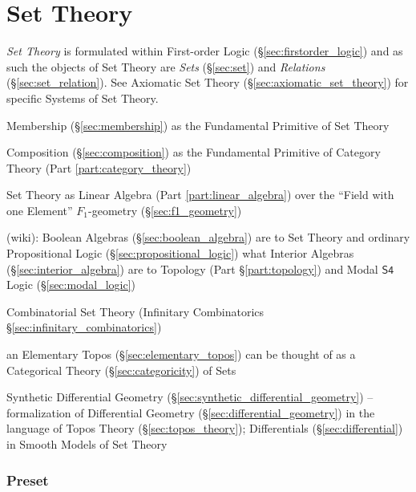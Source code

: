 \part{Set Theory}\label{part:set_theory}

\emph{Set Theory} is formulated within First-order Logic
(\S\ref{sec:firstorder_logic}) and as such the objects of Set Theory
are \emph{Sets} (\S\ref{sec:set}) and \emph{Relations}
(\S\ref{sec:set_relation}). See Axiomatic Set Theory
(\S\ref{sec:axiomatic_set_theory}) for specific Systems of Set Theory.

Membership (\S\ref{sec:membership}) as the Fundamental Primitive of Set
Theory

Composition (\S\ref{sec:composition}) as the Fundamental Primitive of
Category Theory (Part \ref{part:category_theory})

Set Theory as Linear Algebra (Part \ref{part:linear_algebra}) over the
``Field with one Element'' \fist $F_1$-geometry (\S\ref{sec:f1_geometry})

(wiki):
Boolean Algebras (\S\ref{sec:boolean_algebra}) are to Set Theory and ordinary
Propositional Logic (\S\ref{sec:propositional_logic}) what Interior Algebras
(\S\ref{sec:interior_algebra}) are to Topology (Part \S\ref{part:topology}) and
Modal $\mathsf{S4}$ Logic (\S\ref{sec:modal_logic})

Combinatorial Set Theory (Infinitary Combinatorics
\S\ref{sec:infinitary_combinatorics})

an Elementary Topos (\S\ref{sec:elementary_topos}) can be thought of as a
Categorical Theory (\S\ref{sec:categoricity}) of Sets

\fist Synthetic Differential Geometry
(\S\ref{sec:synthetic_differential_geometry}) -- formalization of Differential
Geometry (\S\ref{sec:differential_geometry}) in the language of Topos Theory
(\S\ref{sec:topos_theory}); Differentials (\S\ref{sec:differential}) in Smooth
Models of Set Theory



\section{Preset}\label{sec:preset}

